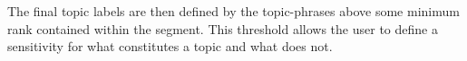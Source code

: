     The final topic labels are then defined by the topic-phrases above some minimum rank contained within the segment. This threshold allows the user to define a sensitivity for what constitutes a topic and what does not.

